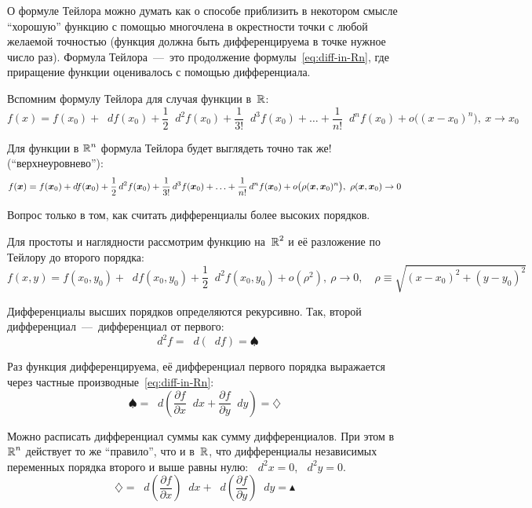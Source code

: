 \documentclass[a4paper,12pt]{article}
\newcommand{\diff}{\mathop{}\!d}
\begin{document}

  О формуле Тейлора можно думать как о способе приблизить в некотором смысле ``хорошую'' функцию с помощью многочлена в окрестности точки с любой желаемой точностью (функция должна быть дифференцируема в точке нужное число раз).
  Формула Тейлора~---~это продолжение формулы~\eqref{eq:diff-in-Rn}, где приращение функции оценивалось с помощью дифференциала.

  Вспомним формулу Тейлора для случая функции в~$\operatorname{\mathbb R}$:
  \[
    f(x) = f(x_0) + \diff f(x_0) + \frac{1}{2} \diff^2 f(x_0) + \frac{1}{3!} \diff^3 f(x_0) + \ldots + \frac{1}{n!} \diff^n f(x_0) + o\bigl((x - x_0)^n\bigr),\ x \to x_0
  \]

  Для функции в $\operatorname{\mathbb R}^n$ формула Тейлора будет выглядеть точно так же! (``верхнеуровнево''):
  \[
    f(\bds x) = f(\bds x_0) + \diff f(\bds x_0) + \frac{1}{2} \diff^2 f(\bds x_0) + \frac{1}{3!} \diff^3 f(\bds x_0) + \ldots + \frac{1}{n!} \diff^n f(\bds x_0) + o\bigl(\rho(\bds x, \bds x_0)^n\bigr),\ \rho(\bds x, \bds x_0) \to 0
  \]

  Вопрос только в том, как считать дифференциалы более высоких порядков.

  Для простоты и наглядности рассмотрим функцию на~$\operatorname{\mathbb R}^2$ и её разложение по Тейлору до второго порядка:
  \begin{equation}\label{eq:taylor-up-to-diff2}
    f(x, y) = f(x_0, y_0) + \diff f(x_0, y_0) + \frac{1}{2} \diff^2 f(x_0, y_0) + o(\rho^2),\ \rho \to 0,\quad \rho \equiv \sqrt{(x - x_0)^2 + (y - y_0)^2}
  \end{equation}

  Дифференциалы высших порядков определяются рекурсивно.
  Так, второй дифференциал~---~дифференциал от первого:
  \[
    \diff^2 f = \diff (\diff f) = \spadesuit
  \]

  Раз функция дифференцируема, её дифференциал первого порядка выражается через частные производные~\eqref{eq:diff-in-Rn}:
  \[
    \spadesuit = \diff \left(\frac{\partial f}{\partial x} \diff x + \frac{\partial f}{\partial y} \diff y\right) = \diamondsuit
  \]

  Можно расписать дифференциал суммы как сумму дифференциалов.
  При этом в $\operatorname{\mathbb R}^n$ действует то же ``правило'', что и в~$\operatorname{\mathbb R}$, что дифференциалы независимых переменных порядка второго и выше равны нулю: $\diff^2 x = 0$, $\diff^2 y = 0$.
  \[
    \diamondsuit = \diff \left(\frac{\partial f}{\partial x}\right) \diff x + \diff \left(\frac{\partial f}{\partial y}\right) \diff y = \blacktriangle
  \]
\end{document}
